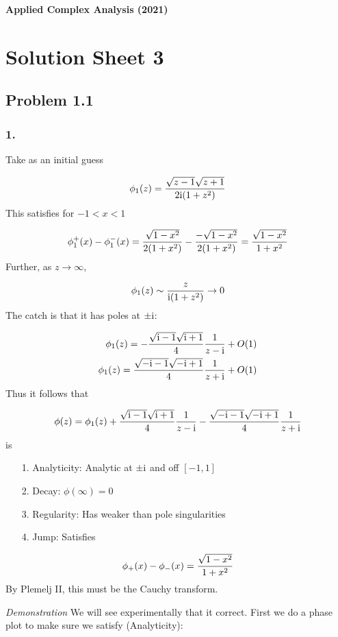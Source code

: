 \documentclass[12pt,landscape]{article}
\def\I{ {\rm i} }
\begin{document}
{\LARGE
\sf
\textbf{Applied Complex Analysis (2021)}

\section{Solution Sheet 3}
\subsection{Problem 1.1}
\subsubsection{1.}
Take as an initial guess

\[
 \phi_1(z) = {\sqrt{z-1} \sqrt{z+1}  \over 2\I(1 + z^2)}
\]
This satisfies for $-1 < x < 1$

\[
\phi_1^+(x) -\phi_1^-(x) = { \sqrt{1-x^2}  \over 2(1 + x^2)} -  {- \sqrt{1-x^2}  \over 2(1 + x^2)} = {\sqrt{1 - x^2} \over 1+x^2}
\]
Further, as $z \rightarrow \infty$,

\[
\phi_1(z) \sim {z \over \I(1+ z^2)} \rightarrow 0
\]
The catch is that it has poles at $\pm \I$:


\begin{align*}
    \phi_1(z) = -{\sqrt{\I -1} \sqrt{\I+1} \over 4} { 1 \over z - \I} + O(1)  \\
    \phi_1(z) = {\sqrt{-\I -1} \sqrt{-\I+1} \over 4} { 1 \over z + \I} + O(1)
\end{align*}
Thus it follows that

\[
\phi(z) =  \phi_1(z) + {\sqrt{\I -1} \sqrt{\I+1} \over 4} { 1 \over z - \I} - {\sqrt{-\I -1} \sqrt{-\I+1} \over 4} { 1 \over z + \I}
\]
is

\begin{itemize}
\item[1. ] Analyticity: Analytic at $\pm \I$ and off $[-1,1]$


\item[2. ] Decay: $\phi(\infty) = 0$


\item[3. ] Regularity: Has weaker than pole singularities


\item[4. ] Jump: Satisfies

\end{itemize}
\[
\phi_+(x) - \phi_-(x) = {\sqrt{1-x^2} \over 1+x^2}
\]
By Plemelj II, this must be the Cauchy transform.

\emph{Demonstration} We will see experimentally that it correct. First we do a phase plot to make sure we satisfy (Analyticity):


}
\end{document}

